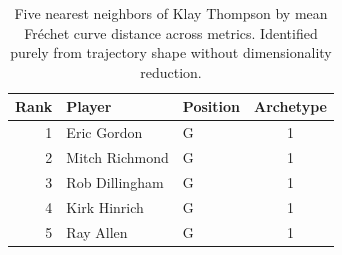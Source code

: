 \begin{table}[htbp]
  \centering\small
  \begin{tabular}{rllc}
    \toprule
    Rank & Player & Position & Archetype \\
    \midrule
    1 & Eric Gordon & G & 1 \\
    2 & Mitch Richmond & G & 1 \\
    3 & Rob Dillingham & G & 1 \\
    4 & Kirk Hinrich & G & 1 \\
    5 & Ray Allen & G & 1 \\
    \bottomrule
  \end{tabular}
  \caption{Five nearest neighbors of Klay Thompson by mean Fr\'{e}chet curve distance across metrics. Identified purely from trajectory shape without dimensionality reduction.}
  \label{tab:Klay_Thompson_frechet_curve_neighbors}
\end{table}

